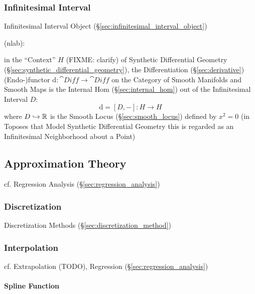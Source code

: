 \subsubsection{Infinitesimal Interval}\label{sec:infinitesimal_interval}

\fist Infinitesimal Interval Object (\S\ref{sec:infinitesimal_interval_object})

(nlab):

in the ``Context'' $H$ (FIXME: clarify) of Synthetic Differential Geometry
(\S\ref{sec:synthetic_differential_geometry}), the Differentiation
(\S\ref{sec:derivative}) (Endo-)functor $\mathrm{d} : \cat{Diff} \rightarrow
\cat{Diff}$ on the Category of Smooth Manifolds and Smooth Maps is the Internal
Hom (\S\ref{sec:internal_hom}) out of the Infinitesimal Interval $D$:
\[
  \mathrm{d} = [D,-] : H \rightarrow H
\]
where $D \hookrightarrow \mathbb{R}$ is the Smooth Locus (\S\ref{sec:smooth_locus})
defined by $x^2 = 0$ (in Toposes that Model Synthetic Differential Geometry this
is regarded as an Infinitesimal Neighborhood about a Point)



\subsection{Approximation Theory}\label{sec:approximation_theory}

\fist cf. Regression Analysis (\S\ref{sec:regression_analysis})



\subsubsection{Discretization}\label{sec:discretization}

Discretization Methods (\S\ref{sec:discretization_method})



\subsubsection{Interpolation}\label{sec:interpolation}

cf. Extrapolation (TODO), Regression (\S\ref{sec:regression_analysis})



\paragraph{Spline Function}\label{sec:spline}\hfill

